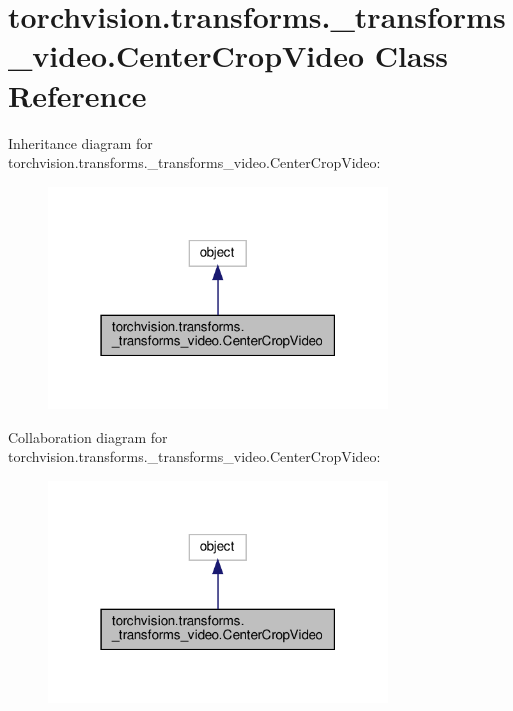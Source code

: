\hypertarget{classtorchvision_1_1transforms_1_1__transforms__video_1_1CenterCropVideo}{}\section{torchvision.\+transforms.\+\_\+transforms\+\_\+video.\+Center\+Crop\+Video Class Reference}
\label{classtorchvision_1_1transforms_1_1__transforms__video_1_1CenterCropVideo}


Inheritance diagram for torchvision.\+transforms.\+\_\+transforms\+\_\+video.\+Center\+Crop\+Video\+:
\nopagebreak
\begin{figure}[H]
\begin{center}
\leavevmode
\includegraphics[width=255pt]{classtorchvision_1_1transforms_1_1__transforms__video_1_1CenterCropVideo__inherit__graph}
\end{center}
\end{figure}


Collaboration diagram for torchvision.\+transforms.\+\_\+transforms\+\_\+video.\+Center\+Crop\+Video\+:
\nopagebreak
\begin{figure}[H]
\begin{center}
\leavevmode
\includegraphics[width=255pt]{classtorchvision_1_1transforms_1_1__transforms__video_1_1CenterCropVideo__coll__graph}
\end{center}
\end{figure}
